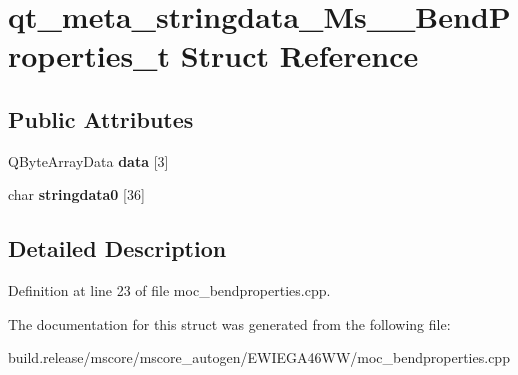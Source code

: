 \hypertarget{structqt__meta__stringdata___ms_____bend_properties__t}{}\section{qt\+\_\+meta\+\_\+stringdata\+\_\+\+Ms\+\_\+\+\_\+\+Bend\+Properties\+\_\+t Struct Reference}
\label{structqt__meta__stringdata___ms_____bend_properties__t}
\subsection*{Public Attributes}
\begin{DoxyCompactItemize}
\item 
\mbox{\label{structqt__meta__stringdata___ms_____bend_properties__t_a7df0703b2c1734875a6203a729f8509a}} 
Q\+Byte\+Array\+Data {\bfseries data} \mbox{[}3\mbox{]}
\item 
\mbox{\label{structqt__meta__stringdata___ms_____bend_properties__t_afcf1c4cc9b23cc7795e5bbca3dd20254}} 
char {\bfseries stringdata0} \mbox{[}36\mbox{]}
\end{DoxyCompactItemize}


\subsection{Detailed Description}


Definition at line 23 of file moc\+\_\+bendproperties.\+cpp.



The documentation for this struct was generated from the following file\+:\begin{DoxyCompactItemize}
\item 
build.\+release/mscore/mscore\+\_\+autogen/\+E\+W\+I\+E\+G\+A46\+W\+W/moc\+\_\+bendproperties.\+cpp\end{DoxyCompactItemize}
